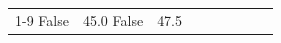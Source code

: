 \begin{table}[H]
\begin{tabular}{lllrlllll}
\cline{1-9}
False & 45.0%
\cline{1-9}
False & 47.5%

\end{tabular}
\end{table}
